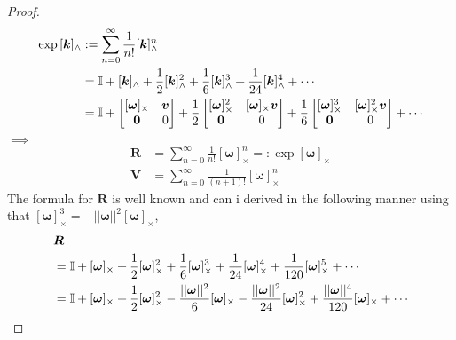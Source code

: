 \begin{proof}
\begin{subequations}
\begin{align}
    \exp{[\bm{k}]_{\wedge}} &:= \sum_{n=0}^{\infty} \frac{1}{n!}[\bm{k}]_{\wedge}^n \\
    &= \mathbb{I} + [\bm{k}]_{\wedge} + \frac{1}{2}[\bm{k}]_{\wedge}^2 + \frac{1}{6}[\bm{k}]_{\wedge}^3 + \frac{1}{24}[\bm{k}]_{\wedge}^4 + \cdots \\
    &= \mathbb{I} + \begin{bmatrix}[\bm{\omega}]_{\times} & \bm{v} \\ \bm{0} & 0\end{bmatrix}
       + \frac{1}{2}\begin{bmatrix}[\bm{\omega}]_{\times}^2 & [\bm{\omega}]_{\times}\bm{v} \\ \bm{0} & 0\end{bmatrix}
       + \frac{1}{6}\begin{bmatrix}[\bm{\omega}]_{\times}^3 & [\bm{\omega}]_{\times}^2\bm{v} \\ \bm{0} & 0\end{bmatrix}
       + \cdots
\end{align}
\end{subequations}
\(\implies\)
\begin{subequations}
\begin{align}
    \bm{R} &= \sum_{n=0}^{\infty} \frac{1}{n!}[\bm{\omega}]_{\times}^n =: \exp{[\bm{\omega}]_{\times}}\\
    \bm{V} &= \sum_{n=0}^{\infty} \frac{1}{\left(n+1\right)!}[\bm{\omega}]_{\times}^n
\end{align}
\end{subequations}
The formula for \(\bm{R}\) is well known and can i derived in the following manner
using that \([\bm{\omega}]_{\times}^3 = -||\bm{\omega}||^2[\bm{\omega}]_{\times}\),
\begin{subequations}
\begin{align*}
&\bm{R}\\ &= \I + [\bm{\omega}]_{\times} + \frac{1}{2}[\bm{\omega}]_{\times}^2 + \frac{1}{6}[\bm{\omega}]_{\times}^3 + \frac{1}{24}[\bm{\omega}]_{\times}^4 + \frac{1}{120}[\bm{\omega}]_{\times}^5 + \cdots \\
       &= \I + [\bm{\omega}]_{\times} + \frac{1}{2}[\bm{\omega}]_{\times}^2 -\frac{||\bm{\omega}||^2}{6}[\bm{\omega}]_{\times} - \frac{||\bm{\omega}||^2}{24}[\bm{\omega}]_{\times}^2 + \frac{||\bm{\omega}||^4}{120}[\bm{\omega}]_{\times} + \cdots \\

\end{align*}
\end{subequations}
\end{proof}
